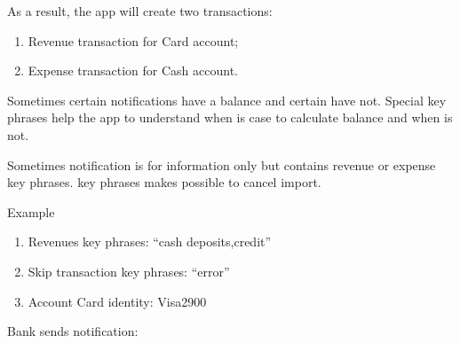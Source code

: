 \documentclass[a4paper,10pt,english]{sphinxmanual}
\begin{document}
As a result, the app will create two transactions:
\begin{enumerate}
\def\theenumi{\arabic{enumi}}
\def\labelenumi{\theenumi .}
\makeatletter\def\p@enumii{\p@enumi \theenumi .}\makeatother
\item {} 
Revenue transaction for Card account;

\item {} 
Expense transaction for Cash account.

\end{enumerate}

\noindent{}
\noindent{}

Sometimes certain notifications have a balance and certain have not. Special
key phrases help the app to understand when is case to calculate balance and when is not.

Sometimes notification is for information only but contains revenue or expense key phrases.
 key phrases makes possible to cancel import.

Example
\begin{enumerate}
\def\theenumi{\arabic{enumi}}
\def\labelenumi{\theenumi .}
\makeatletter\def\p@enumii{\p@enumi \theenumi .}\makeatother
\item {} 
Revenues key phrases: “cash deposits,credit”

\item {} 
Skip transaction key phrases: “error”

\item {} 
Account Card identity: Visa2900

\end{enumerate}

Bank sends notification:

\begin{sphinxVerbatim}[commandchars=\\\{\}]
             
\end{sphinxVerbatim}
\end{document}
